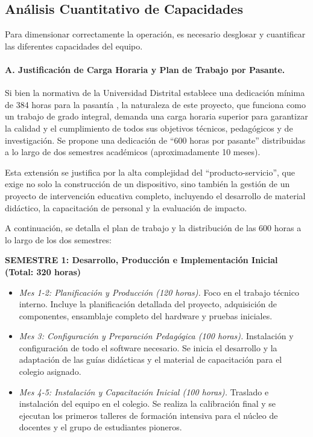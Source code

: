 \subsection*{Análisis Cuantitativo de Capacidades}

Para dimensionar correctamente la operación, es necesario desglosar y cuantificar las diferentes capacidades del equipo.

\paragraph{A. Justificación de Carga Horaria y Plan de Trabajo por Pasante.}
Si bien la normativa de la Universidad Distrital establece una dedicación mínima de 384 horas para la pasantía \cite{ud_2022_acuerdo012}, la naturaleza de este proyecto, que funciona como un trabajo de grado integral, demanda una carga horaria superior para garantizar la calidad y el cumplimiento de todos sus objetivos técnicos, pedagógicos y de investigación. Se propone una dedicación de ``600 horas por pasante'' distribuidas a lo largo de dos semestres académicos (aproximadamente 10 meses).

Esta extensión se justifica por la alta complejidad del ``producto-servicio'', que exige no solo la construcción de un dispositivo, sino también la gestión de un proyecto de intervención educativa completo, incluyendo el desarrollo de material didáctico, la capacitación de personal y la evaluación de impacto.

A continuación, se detalla el plan de trabajo y la distribución de las 600 horas a lo largo de los dos semestres:

\vspace{0.5cm} %

\textbf{SEMESTRE 1: Desarrollo, Producción e Implementación Inicial (Total: 320 horas)}
\begin{itemize}
    \item \textit{Mes 1-2: Planificación y Producción (120 horas).} Foco en el trabajo técnico interno. Incluye la planificación detallada del proyecto, adquisición de componentes, ensamblaje completo del hardware y pruebas iniciales.
    
    \item \textit{Mes 3: Configuración y Preparación Pedagógica (100 horas).} Instalación y configuración de todo el software necesario. Se inicia el desarrollo y la adaptación de las guías didácticas y el material de capacitación para el colegio asignado.
    
    \item \textit{Mes 4-5: Instalación y Capacitación Inicial (100 horas).} Traslado e instalación del equipo en el colegio. Se realiza la calibración final y se ejecutan los primeros talleres de formación intensiva para el núcleo de docentes y el grupo de estudiantes pioneros.
\end{itemize}

